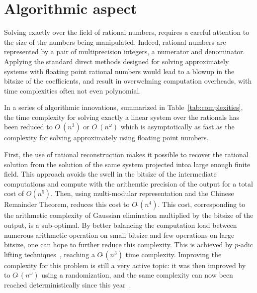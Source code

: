 \newcommand{\GO}[1]{\ensuremath{O(#1)}\xspace}
\newcommand{\SO}[1]{\ensuremath{O\tilde\ (#1)}\xspace}
\newcommand{\vect}[1]{\ensuremath{\mathbf{#1}}\xspace}
\newcommand{\mat}[1]{\ensuremath{\mathbf{#1}}\xspace}
\section{Algorithmic aspect}

Solving exactly over the field of rational numbers, requires a careful attention to the size of the numbers being
manipulated. Indeed, rational numbers are represented by a pair of multiprecision integers, a numerator and
denominator. Applying the standard direct methods designed for solving approximately systems with floating point
rational numbers would lead to a blowup in the bitsize of the coefficients, and result in overwelming computation
overheads, with time complexities often not even polynomial.

In a series of algorithmic innovations, summarized in Table~\ref{tab:complexities}, the time complexity for solving exactly a linear system over the rationals has
been reduced to $\SO{n^3}$ or $\SO{n^\omega}$ which is asymptotically as fast as the complexity for solving
approximately using floating point numbers.

First, the use of rational reconstruction makes it possible to recover the rational solution from the solution of the same
system projected intoa large enough finite field.
This approach avoids the  swell in the bitsize of the intermediate computations and compute with the arithemtic precision of the output for a total cost of $\GO{n^5}$.
Then, using  multi-modular representation and the Chinese Remainder Theorem, reduces this cost  to $\SO{n^4}$.
This cost, corresponding to the arithmetic complexity of Gaussian elimination multiplied by the bitsize of the output,
is a sub-optimal. By better balancing the computation load between numerous arithmetic operation on small bitsize and
few operations on large bitsize, one can hope to further reduce this complexity. This is achieved by $p$-adic lifting
techniques~\cite{Dix82}, reaching a $\SO{n^3}$ time complexity. Improving the complexity for this problem is still a
very active topic: it was then improved by~\cite{Sto05} to $\SO{n^\omega}$ using a randomization, and the same
complexity can now been reached deterministically since this year~\cite{BLS19}.



